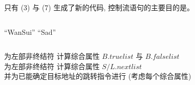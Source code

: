 \begin{frame}{}
  \begin{center}
  \end{center}
\end{frame}

\begin{frame}{}

  \begin{center}
    只有 (3) 与 (7) 生成了新的代码, 控制流语句的主要目的是。
  \end{center}
\end{frame}

\begin{frame}[fragile]{}
  \begin{columns}
      \begin{algorithm}[H]
        \begin{algorithmic}[1]
                \State {} ``WanSui''
              \EndWhile
            \Else
              \State {} ``Sad''
            \EndIf
          \EndProcedure
        \end{algorithmic}
      \end{algorithm}
  \end{columns}
\end{frame}

\begin{frame}{}
  \pause
  \pause
\end{frame}

\begin{frame}{}
  \begin{center}
    为左部非终结符  计算综合属性 $B.\mathit{truelist}$ 与 $B.\mathit{falselist}$ \\[20pt]
    为左部非终结符  计算综合属性 $S/L.\mathit{nextlist}$ \\[40pt]
    并为已能确定目标地址的跳转指令进行 (考虑每个综合属性)
  \end{center}
\end{frame}

\begin{frame}{}
\end{frame}
